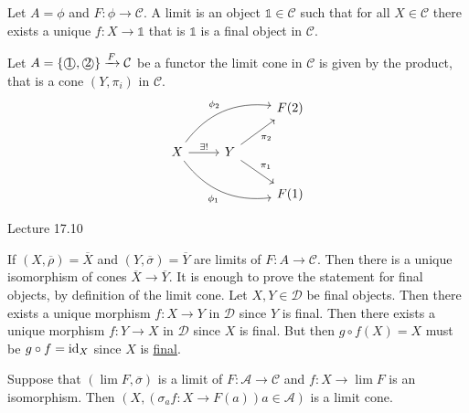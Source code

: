 \begin{exmp}
    Let $A=\phi$ and $F\colon \phi \to \mathcal{C}$. 
    A limit is an object $\mathds{1} \in \mathcal{C}$ such that for all $X \in \mathcal{C}$ there exists a unique $f \colon X \to \mathds{1}$ that is $\mathds{1}$ is a final object in $\mathcal{C}$.
\end{exmp}

\begin{exmp}
    Let $A = \{ \text{\textcircled{1}} , \text{\textcircled{2}} \} \xrightarrow{F} \mathcal{C}$ be a functor the limit cone in $\mathcal{C}$ is given by the product, that is a cone $(Y, \pi_i)$ in $\mathcal{C}$.
    \[
    \begin{tikzcd}
        &
        &
        F(2)
        \\
        X
        \arrow[rru, bend left, "\phi_2"]
        \arrow[rrd, bend right, "\phi_1"']
        \arrow[r, "\exists !"]
        &
        Y
        \arrow[ru, "\pi_2"']
        \arrow[rd, "\pi_1"]
        &
        \\
        &
        &
        F(1)
    \end{tikzcd}
    \]
\end{exmp}

Lecture 17.10

If $(X , \overline{\rho}) = \overline{X}$ and $(Y , \overline{\sigma})=\overline{Y}$ are limits of $F \colon A \to \mathcal{C}$.
Then there is a unique isomorphism of cones $\overline{X} \to \overline{Y}$.
It is enough to prove the statement for final objects, by definition of the limit cone.
Let $X,Y \in \mathcal{D}$ be final objects.
Then there exists a unique morphism $f \colon X \to Y$ in $\mathcal{D}$ since $Y$ is final.
Then there exists a unique morphism $f \colon Y \to X$ in $\mathcal{D}$ since $X$ is final.
But then $g \circ f (X) = X$ must be $g \circ f = \operatorname{id}_X$ since $X$ is \underline{final}.

\begin{prop}
    Suppose that $(\lim F , \overline{\sigma} )$ is a limit of $F \colon \mathcal{A} \to \mathcal{C}$ and $f \colon X \to \lim F$ is an isomorphism.
    Then $(X ,(\sigma_a f\colon X \to F(a)) a \in \mathcal{A})$ is a limit cone.
\end{prop}

